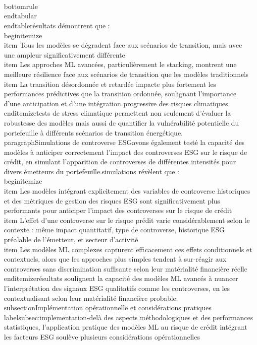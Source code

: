 \\\\\n\\bottomrule\n\\end{tabular}\n\\end{table}\n\nCes résultats démontrent que :\n\n\\begin{itemize}\n    \\item Tous les modèles se dégradent face aux scénarios de transition, mais avec une ampleur significativement différente\n    \n    \\item Les approches ML avancées, particulièrement le stacking, montrent une meilleure résilience face aux scénarios de transition que les modèles traditionnels\n    \n    \\item La transition désordonnée et retardée impacte plus fortement les performances prédictives que la transition ordonnée, soulignant l'importance d'une anticipation et d'une intégration progressive des risques climatiques\n\\end{itemize}\n\nCes tests de stress climatique permettent non seulement d'évaluer la robustesse des modèles mais aussi de quantifier la vulnérabilité potentielle du portefeuille à différents scénarios de transition énergétique.\n\n\\paragraph{Simulations de controverse ESG}\n\nNous avons également testé la capacité des modèles à anticiper correctement l'impact des controverses ESG sur le risque de crédit, en simulant l'apparition de controverses de différentes intensités pour divers émetteurs du portefeuille.\n\nCes simulations révèlent que :\n\n\\begin{itemize}\n    \\item Les modèles intégrant explicitement des variables de controverse historiques et des métriques de gestion des risques ESG sont significativement plus performants pour anticiper l'impact des controverses sur le risque de crédit\n    \n    \\item L'effet d'une controverse sur le risque prédit varie considérablement selon le contexte : même impact quantitatif, type de controverse, historique ESG préalable de l'émetteur, et secteur d'activité\n    \n    \\item Les modèles ML complexes capturent efficacement ces effets conditionnels et contextuels, alors que les approches plus simples tendent à sur-réagir aux controverses sans discrimination suffisante selon leur matérialité financière réelle\n\\end{itemize}\n\nCes résultats soulignent la capacité des modèles ML avancés à nuancer l'interprétation des signaux ESG qualitatifs comme les controverses, en les contextualisant selon leur matérialité financière probable.\n\n\\subsection{Implémentation opérationnelle et considérations pratiques}\\label{subsec:implementation}\n\nAu-delà des aspects méthodologiques et des performances statistiques, l'application pratique des modèles ML au risque de crédit intégrant les facteurs ESG soulève plusieurs considérations opérationnelles 